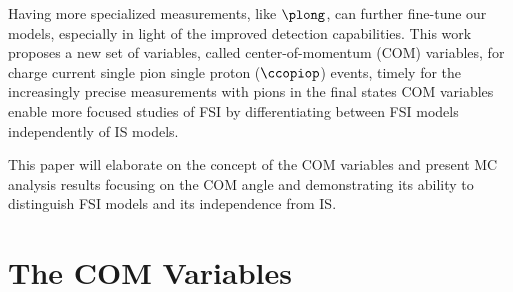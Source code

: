 Having more specialized measurements, like $\plong$, can further fine-tune our models, especially in light of the improved detection capabilities. 
This work proposes a new set of variables, called center-of-momentum (COM) variables, for charge current single pion single proton ($\ccopiop$) events, timely for the increasingly precise measurements with pions in the final states
COM variables enable more focused studies of FSI by differentiating between FSI models independently of IS models.

This paper will elaborate on the concept of the COM variables and present MC analysis results focusing on the COM angle and demonstrating its ability to distinguish FSI models and its independence from IS.

\section{The COM Variables}



\minitoc